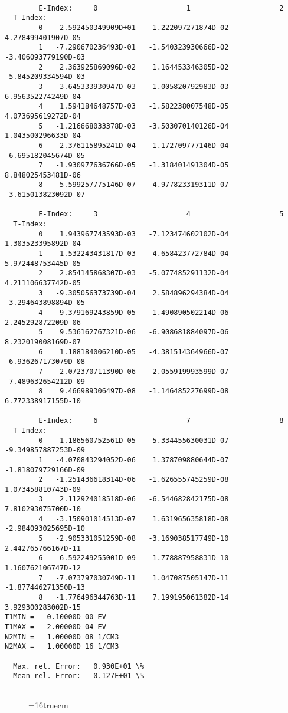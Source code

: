 \documentclass[12pt,dvipdfmx]{article}
\begin{document}
\begin{small}\begin{verbatim}

        E-Index:     0                     1                     2
  T-Index:
        0   -2.592450349909D+01    1.222097271874D-02    4.278499401907D-05
        1   -7.290670236493D-01   -1.540323930666D-02   -3.406093779190D-03
        2    2.363925869096D-02    1.164453346305D-02   -5.845209334594D-03
        3    3.645333930947D-03   -1.005820792983D-03    6.956352274249D-04
        4    1.594184648757D-03   -1.582238007548D-05    4.073695619272D-04
        5   -1.216668033378D-03   -3.503070140126D-04    1.043500296633D-04
        6    2.376115895241D-04    1.172709777146D-04   -6.695182045674D-05
        7   -1.930977636766D-05   -1.318401491304D-05    8.848025453481D-06
        8    5.599257775146D-07    4.977823319311D-07   -3.615013823092D-07

        E-Index:     3                     4                     5
  T-Index:
        0    1.943967743593D-03   -7.123474602102D-04    1.303523395892D-04
        1    1.532243431817D-03   -4.658423772784D-04    5.972448753445D-05
        2    2.854145868307D-03   -5.077485291132D-04    4.211106637742D-05
        3   -9.305056373739D-04    2.584896294384D-04   -3.294643898894D-05
        4   -9.379169243859D-05    1.490890502214D-06    2.245292872209D-06
        5    9.536162767321D-06   -6.908681884097D-06    8.232019008169D-07
        6    1.188184006210D-05   -4.381514364966D-07   -6.936267173079D-08
        7   -2.072370711390D-06    2.055919993599D-07   -7.489632654212D-09
        8    9.466989306497D-08   -1.146485227699D-08    6.772338917155D-10

        E-Index:     6                     7                     8
  T-Index:
        0   -1.186560752561D-05    5.334455630031D-07   -9.349857887253D-09
        1   -4.070843294052D-06    1.378709880644D-07   -1.818079729166D-09
        2   -1.251436618314D-06   -1.626555745259D-08    1.073458810743D-09
        3    2.112924018518D-06   -6.544682842175D-08    7.810293075700D-10
        4   -3.150901014513D-07    1.631965635818D-08   -2.984093025695D-10
        5   -2.905331051259D-08   -3.169038517749D-10    2.442765766167D-11
        6    6.592249255001D-09   -1.778887958831D-10    1.160762106747D-12
        7   -7.073797030749D-11    1.047087505147D-11   -1.877446271350D-13
        8   -1.776496344763D-11    7.199195061382D-14    3.929300283002D-15
T1MIN =   0.10000D 00 EV
T1MAX =   2.00000D 04 EV
N2MIN =   1.00000D 08 1/CM3
N2MAX =   1.00000D 16 1/CM3

  Max. rel. Error:   0.930E+01 \%
  Mean rel. Error:   0.127E+01 \%


\end{verbatim}\end{small}
\begin{figure} \label{2.1.8r}
\epsfxsize=16truecm
\end{figure}
\newpage
\end{document}
